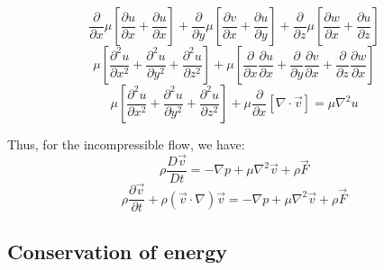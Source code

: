 \documentclass[11pt]{article} %
\begin{document}
$$
\frac{\partial }{\partial x}\mu \left[\frac{\partial u}{\partial x}+\frac{\partial u}{\partial x} \right]+\frac{\partial }{\partial y}\mu \left[\frac{\partial v}{\partial x}+\frac{\partial u}{\partial y} \right] + \frac{\partial }{\partial z}\mu \left[\frac{\partial w}{\partial x}+\frac{\partial u}{\partial z} \right]
$$
$$
\mu \left[\frac{\partial^{2} u}{\partial x^{2}} + \frac{\partial^{2} u}{\partial y^{2}}+\frac{\partial^{2} u}{\partial z^{2}}  \right]+\mu\left[\frac{\partial }{\partial x}\frac{\partial u}{\partial x}+\frac{\partial }{\partial y}\frac{\partial v}{\partial x} +\frac{\partial }{\partial z}\frac{\partial w}{\partial x}\right]
$$
$$
\mu \left[\frac{\partial^{2} u}{\partial x^{2}} + \frac{\partial^{2} u}{\partial y^{2}}+\frac{\partial^{2} u}{\partial z^{2}}  \right]+\mu\frac{\partial }{\partial x}\left[\nabla \cdot \vec{v}  \right]=\mu \nabla^{2}u
$$\par 
Thus, for the incompressible flow, we have:
\begin{equation}
\rho \frac{D \vec{v}}{Dt} = -\nabla p + \mu \nabla^{2}\vec{v} +\rho \vec{F}
\end{equation}
\begin{equation}
\rho \frac{\partial \vec{v}}{\partial t} + {\rho (\vec{v} \cdot \nabla)\vec{v}} = -\nabla p + \mu \nabla^{2}\vec{v} +\rho \vec{F}
\end{equation}



\subsection{Conservation of energy}
\end{document}
